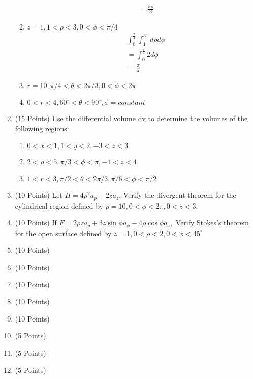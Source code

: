 \documentclass{article}
\begin{document}
\begin{enumerate}
\begin{enumerate}
\begin{align}
            &=\boxed{\frac{5\pi}{3}} 
        \end{align}
        \item $z = 1, 1 < \rho < 3, 0 < \phi < \pi/4$
        \begin{align}
            &\int_0^{\frac{\pi}{4}}\int_1^31d\rho d\phi\\
            &=\int_0^{\frac{\pi}{4}}2d\phi\\
            &=\frac{\pi}{2}
        \end{align}                                                         
        \item $r = 10, \pi/4 < \theta < 2\pi/3, 0 < \phi < 2\pi$
        \item $0 < r < 4, 60^\circ < \theta < 90^\circ, \phi =  constant$
    \end{enumerate}
    \item (15 Points) Use the differential volume dv to determine the volumes of the following regions:
    \begin{enumerate}
        \item $0 < x < 1, 1 < y < 2, -3 < z < 3$
        \item $2 < \rho < 5, \pi/3 < \phi < \pi, -1 < z < 4$
        \item $1 < r < 3, \pi/2 < \theta < 2\pi/3,\pi/6 < \phi < \pi/2$
    \end{enumerate}
    \item (10 Points) Let $H = 4\rho^2a_p - 2za_z.$ Verify the divergent theorem for the cylindrical region defined by $\rho = 10, 0 < \phi < 2\pi, 0 < z < 3.$
    \item (10 Points) If $F = 2\rho za_p+3z\sin\phi a_\phi-4\rho\cos\phi a_z,$ Verify Stokes's theorem for the open surface defined by $z = 1, 0 < \rho < 2, 0 < \phi < 45^\circ$
    \item (10 Points)
    \item (10 Points)
    \item (10 Points)
    \item (10 Points)
    \item (10 Points)
    \item (5 Points)
    \item (5 Points)
    \item (5 Points)
\end{enumerate}
\end{document}
